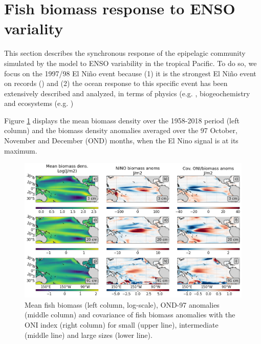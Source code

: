 \section{Fish biomass response to ENSO variality}

This section describes the synchronous response of the epipelagic community simulated by the model to ENSO variability in the tropical Pacific. To do so, we focus on the 1997/98 El Niño event because (1) it is the strongest El Niño event on records (\cite{santosoDefiningCharacteristicsENSO2017}) and (2) the ocean response to this specific event has been extensively described and analyzed, in terms of physics  (e.g. \cite{mcphadenGenesisEvolution1997981999, vialardModelStudyOceanic2001, lengaigneOceanResponseMarch2002}, biogeochemistry \citep{chavezBiologicalChemicalResponse1999, gierachBiologicalResponse19972012} and ecosystems (e.g. \cite{leaObservationsFishesAssociated2000, glynnCoralBleachingMortality2001,arcosJackMackerelFishery2001})

Figure \ref{fig:mean_ond97_ape} displays the mean biomass density over the 1958-2018 period (left column) and the biomass density anomalies averaged over the 97 October, November and December (OND) months, when the El Nino signal is at its maximum.

\begin{figure}
	\centering
	\includegraphics[scale=0.4]{figs/map_mean_anom_OND_97.png}	
	\caption{Mean fish biomass (left column, log-scale), OND-97 anomalies (middle column) and covariance of fish biomass anomalies with the ONI index (right column) for small (upper line), intermediate (middle line) and large sizes (lower line).}	
	\label{fig:mean_ond97_ape}
\end{figure}

